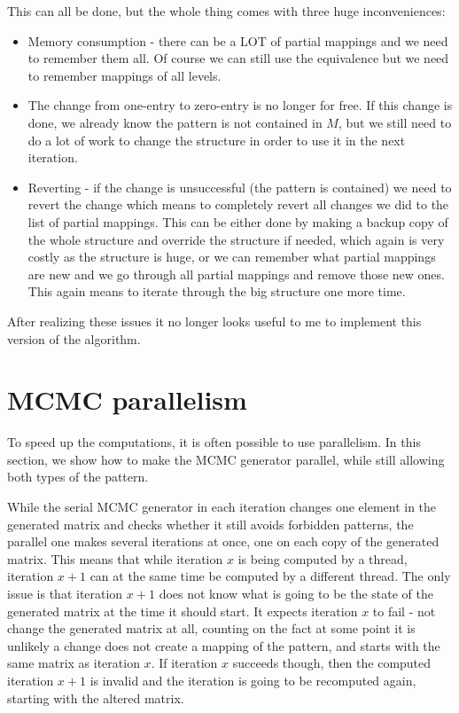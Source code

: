 This can all be done, but the whole thing comes with three huge inconveniences:
\begin{itemize}
\item Memory consumption - there can be a LOT of partial mappings and we need to remember them all. Of course we can still use the equivalence but we need to remember mappings of all levels.
\item The change from one-entry to zero-entry is no longer for free. If this change is done, we already know the pattern is not contained in $M$, but we still need to do a lot of work to change the structure in order to use it in the next iteration.
\item Reverting - if the change is unsuccessful (the pattern is contained) we need to revert the change which means to completely revert all changes we did to the list of partial mappings. This can be either done by making a backup copy of the whole structure and override the structure if needed, which again is very costly as the structure is huge, or we can remember what partial mappings are new and we go through all partial mappings and remove those new ones. This again means to iterate through the big structure one more time.
\end{itemize}
After realizing these issues it no longer looks useful to me to implement this version of the algorithm.

\section{MCMC parallelism}
\label{sect:parallel}
To speed up the computations, it is often possible to use parallelism. In this section, we show how to make the MCMC generator parallel, while still allowing both types of the pattern.

While the serial MCMC generator in each iteration changes one element in the generated matrix and checks whether it still avoids forbidden patterns, the parallel one makes several iterations at once, one on each copy of the generated matrix. This means that while iteration $x$ is being computed by a thread, iteration $x+1$ can at the same time be computed by a different thread. The only issue is that iteration $x+1$ does not know what is going to be the state of the generated matrix at the time it should start. It expects iteration $x$ to fail - not change the generated matrix at all, counting on the fact at some point it is unlikely a change does not create a mapping of the pattern, and starts with the same matrix as iteration $x$. If iteration $x$ succeeds though, then the computed iteration $x+1$ is invalid and the iteration is going to be recomputed again, starting with the altered matrix.

